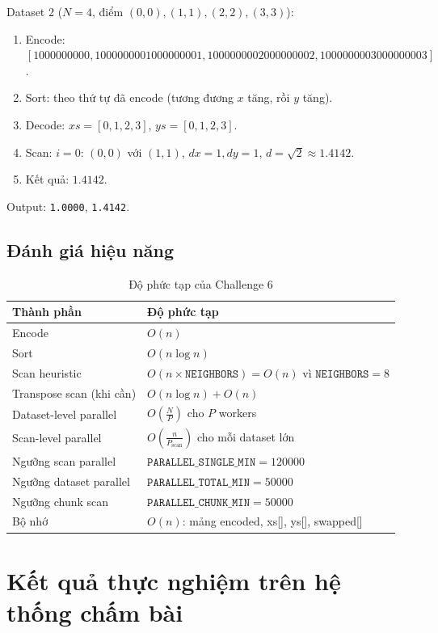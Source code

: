 \documentclass[12pt,a4paper]{article}
\begin{document}
Dataset 2 ($N=4$, điểm $(0,0), (1,1), (2,2), (3,3)$):
\begin{enumerate}
  \item Encode: $[1000000000, 1000000001000000001, 1000000002000000002, 1000000003000000003]$.
  \item Sort: theo thứ tự đã encode (tương đương $x$ tăng, rồi $y$ tăng).
  \item Decode: $xs=[0,1,2,3]$, $ys=[0,1,2,3]$.
  \item Scan: $i=0$: $(0,0)$ với $(1,1)$, $dx=1, dy=1$, $d=\sqrt{2}\approx 1.4142$.
  \item Kết quả: $1.4142$.
\end{enumerate}

Output: \texttt{1.0000}, \texttt{1.4142}.

\subsection{Đánh giá hiệu năng}

\begin{table}[H]
\centering
\caption{Độ phức tạp của Challenge 6}
\begin{tabularx}{\textwidth}{p{4.5cm}Y}
\toprule
\textbf{Thành phần} & \textbf{Độ phức tạp} \\
\midrule
Encode & $O(n)$ \\
Sort & $O(n \log n)$ \\
Scan heuristic & $O(n \times \texttt{NEIGHBORS}) = O(n)$ vì $\texttt{NEIGHBORS}=8$ \\
Transpose scan (khi cần) & $O(n \log n) + O(n)$ \\
\midrule
\midrule
Dataset-level parallel & $O(\frac{N}{P})$ cho $P$ workers \\
Scan-level parallel & $O(\frac{n}{P_\text{scan}})$ cho mỗi dataset lớn \\
\midrule
\midrule
Ngưỡng scan parallel & $\texttt{PARALLEL\_SINGLE\_MIN} = 120000$ \\
Ngưỡng dataset parallel & $\texttt{PARALLEL\_TOTAL\_MIN} = 50000$ \\
Ngưỡng chunk scan & $\texttt{PARALLEL\_CHUNK\_MIN} = 50000$ \\
\midrule
\midrule
Bộ nhớ & $O(n)$: mảng encoded, xs[], ys[], swapped[] \\
\bottomrule
\end{tabularx}
\end{table}

\section{Kết quả thực nghiệm trên hệ thống chấm bài}
\end{document}
